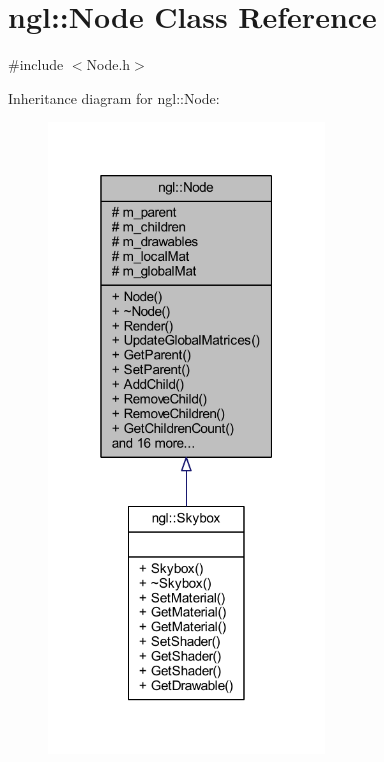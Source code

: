 \hypertarget{classngl_1_1_node}{}\section{ngl\+:\+:Node Class Reference}
\label{classngl_1_1_node}


{\ttfamily \#include $<$Node.\+h$>$}



Inheritance diagram for ngl\+:\+:Node\+:
\nopagebreak
\begin{figure}[H]
\begin{center}
\leavevmode
\includegraphics[width=208pt]{classngl_1_1_node__inherit__graph}
\end{center}
\end{figure}


